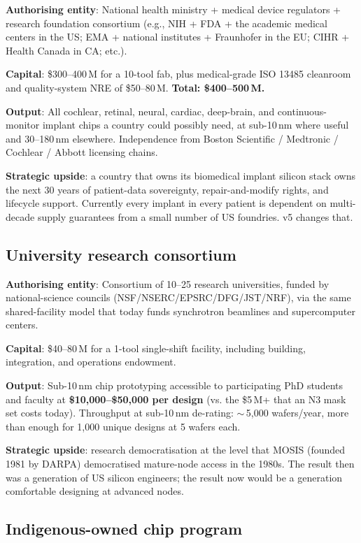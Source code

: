 \documentclass[11pt,letterpaper]{article}
\begin{document}
\textbf{Authorising entity}: National health ministry + medical device regulators + research foundation consortium (e.g., NIH + FDA + the academic medical centers in the US; EMA + national institutes + Fraunhofer in the EU; CIHR + Health Canada in CA; etc.).

\textbf{Capital}: \$300--400\,M for a 10-tool fab, plus medical-grade ISO 13485 cleanroom and quality-system NRE of \$50--80\,M. \textbf{Total: \$400--500\,M.}

\textbf{Output}: All cochlear, retinal, neural, cardiac, deep-brain, and continuous-monitor implant chips a country could possibly need, at sub-10\,nm where useful and 30--180\,nm elsewhere. Independence from Boston Scientific / Medtronic / Cochlear / Abbott licensing chains.

\textbf{Strategic upside}: a country that owns its biomedical implant silicon stack owns the next 30 years of patient-data sovereignty, repair-and-modify rights, and lifecycle support. Currently every implant in every patient is dependent on multi-decade supply guarantees from a small number of US foundries. v5 changes that.

\subsection{University research consortium}

\textbf{Authorising entity}: Consortium of 10--25 research universities, funded by national-science councils (NSF/NSERC/EPSRC/DFG/JST/NRF), via the same shared-facility model that today funds synchrotron beamlines and supercomputer centers.

\textbf{Capital}: \$40--80\,M for a 1-tool single-shift facility, including building, integration, and operations endowment.

\textbf{Output}: Sub-10\,nm chip prototyping accessible to participating PhD students and faculty at \textbf{\$10{,}000--\$50{,}000 per design} (vs. the \$5\,M+ that an N3 mask set costs today). Throughput at sub-10\,nm de-rating: $\sim$\,5{,}000 wafers/year, more than enough for 1{,}000 unique designs at 5 wafers each.

\textbf{Strategic upside}: research democratisation at the level that MOSIS (founded 1981 by DARPA) democratised mature-node access in the 1980s. The result then was a generation of US silicon engineers; the result now would be a generation comfortable designing at advanced nodes.

\subsection{Indigenous-owned chip program}
\end{document}
